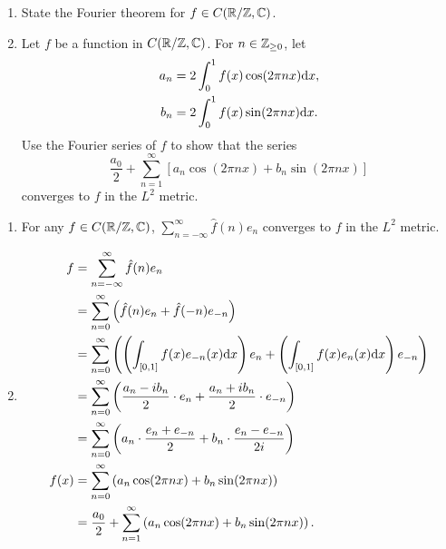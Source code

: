 \documentclass{article}
\begin{document}
\bigskip
\begin{prob}
    \begin{enumerate}[label=(\alph*)]
        \item State the Fourier theorem for $f \in C(\mathbb{R}/\mathbb{Z},\mathbb{C})$.
        \item Let $f$ be a function in $C(\mathbb{R}/\mathbb{Z},\mathbb{C})$. For $n \in \mathbb{Z}_{\geq 0}$, let \begin{align*}
                a_n &= 2 \int_0^1 f(x) \cos(2\pi nx) \mathrm{d} x, \\
                b_n &= 2 \int_0^1 f(x) \sin(2\pi nx) \mathrm{d} x.
        \end{align*}
        Use the Fourier series of $f$ to show that the series
    \[ \frac{a_0}{2} + \sum_{n=1}^\infty \left[ a_n \cos(2\pi nx) + b_n \sin(2\pi nx) \right] \]
        converges to $f$ in the $L^2$ metric.
    \end{enumerate}
\end{prob}
\begin{enumerate}[label=(\alph*)]
    \item For any $f \in C(\mathbb{R}/\mathbb{Z},\mathbb{C})$, $\sum_{n=-\infty}^\infty \hat{f}(n)e_n$ converges to $f$ in the $L^2$ metric.
    \item \begin{align*}
            f &= \sum_{n=-\infty}^\infty \hat{f}(n)e_n \\
              &= \sum_{n=0}^\infty \left( \hat{f}(n)e_n+\hat{f}(-n)e_{-n} \right) \\
              &= \sum_{n=0}^\infty \left( \left( \int_{[0,1]} f(x)e_{-n}(x) \mathrm{d} x \right) e_n+ \left( \int_{[0,1]} f(x) e_n(x) \mathrm{d} x \right) e_{-n} \right) \\
              &= \sum_{n=0}^\infty \left( \frac{a_n-ib_n}{2}\cdot e_n + \frac{a_n+ib_n}{2}\cdot e_{-n} \right) \\
              &= \sum_{n=0}^\infty \left( a_n \cdot \frac{e_n+e_{-n}}{2} + b_n \cdot \frac{e_n-e_{-n}}{2i} \right) \\
            f(x) &= \sum_{n=0}^\infty \left( a_n \cos(2\pi nx) + b_n \sin(2\pi nx) \right) \\
            &= \frac{a_0}{2} + \sum_{n=1}^\infty \left( a_n \cos(2\pi nx) + b_n \sin(2\pi nx) \right).
    \end{align*}
\end{enumerate}
\end{document}
